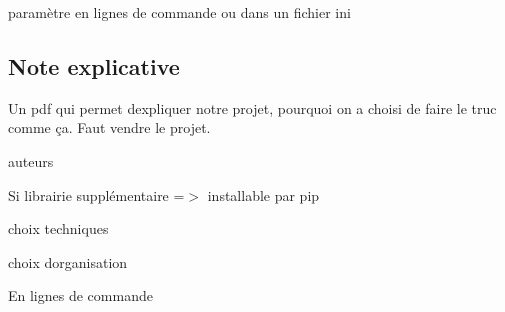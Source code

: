paramètre en lignes de commande ou dans un fichier ini

\subsection*{Note explicative}

Un pdf qui permet d\textquotesingle{}expliquer notre projet, pourquoi on a choisi de faire le truc comme ça. Faut vendre le projet.


\begin{DoxyItemize}
\item auteurs
\item Si librairie supplémentaire =$>$ installable par pip
\item choix techniques
\item choix d\textquotesingle{}organisation
\end{DoxyItemize}

En lignes de commande 